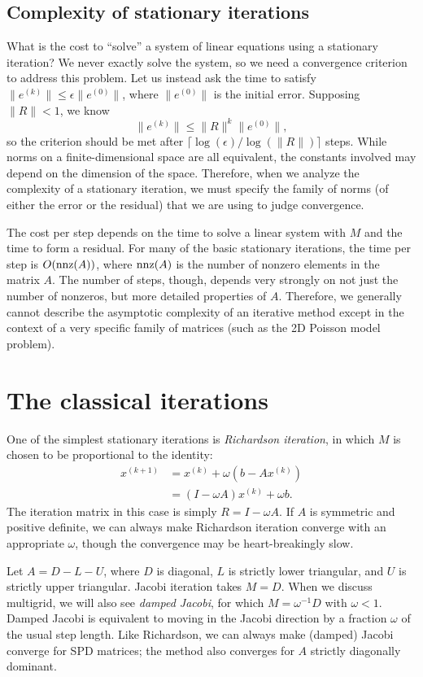 \documentclass[12pt, leqno]{article} %
\begin{document}
\subsection{Complexity of stationary iterations}

What is the cost to ``solve'' a system of linear equations using a
stationary iteration?  We never exactly solve the system, so we need
a convergence criterion to address this problem.  Let us instead ask
the time to satisfy $\|e^{(k)}\| \leq \epsilon \|e^{(0)}\|$, where
$\|e^{(0)}\|$ is the initial error.  Supposing $\|R\| < 1$, we know
\[
  \|e^{(k)}\| \leq \|R\|^k \|e^{(0)}\|,
\]
so the criterion should be met
after $\lceil \log(\epsilon)/\log(\|R\|) \rceil$
steps.
While norms on a finite-dimensional space are all equivalent,
the constants involved may depend on the dimension of the space.
Therefore, when we analyze the complexity of a stationary iteration,
we must specify the family of norms (of either the error or the residual)
that we are using to judge convergence.

The cost per step depends on the time to solve a linear
system with $M$ and the time to form a residual.
For many of the basic stationary iterations, the time per step is
$O(\operatorname{nnz}(A))$, where $\operatorname{nnz}(A)$ is the number of nonzero elements in
the matrix $A$.  The number of steps, though, depends very strongly
on not just the number of nonzeros, but more detailed properties of
$A$.  Therefore, we generally cannot describe the asymptotic complexity
of an iterative method except in the context of a very specific family
of matrices (such as the 2D Poisson model problem).

\section{The classical iterations}

One of the simplest stationary iterations is {\em Richardson iteration},
in which $M$ is chosen to be proportional to the identity:
\begin{align*}
  x^{(k+1)} &= x^{(k)} + \omega (b-Ax^{(k)}) \\
            &= (I-\omega A) x^{(k)} + \omega b.
\end{align*}
The iteration matrix in this case is simply $R = I - \omega A$.  If $A$
is symmetric and positive definite, we can always make Richardson
iteration converge with an appropriate $\omega$, though the convergence
may be heart-breakingly slow.

Let $A = D - L - U$, where $D$ is diagonal, $L$ is strictly lower
triangular, and $U$ is strictly upper triangular.  Jacobi iteration
takes $M = D$.  When we discuss multigrid, we will also see  {\em damped
Jacobi}, for which $M = \omega^{-1} D$ with $\omega < 1$.  Damped Jacobi
is equivalent to moving in the Jacobi direction by a fraction $\omega$
of the usual step length.  Like Richardson, we can always make (damped)
Jacobi converge for SPD matrices; the method also converges for $A$
strictly diagonally dominant.
\end{document}
